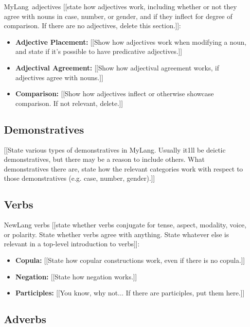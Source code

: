\documentclass[oneside]{book}
\newcommand{\LanguageName}{MyLang}
\begin{document}
\LanguageName\ adjectives [[state how adjectives work, including whether or not they agree with nouns in case, number, or gender, and if they inflect for degree of comparison.
If there are no adjectives, delete this section.]]:

\begin{itemize}
\item
\textbf{Adjective Placement:}
[[Show how adjectives work when modifying a noun, and state if it's possible to have predicative adjectives.]]
\item
\textbf{Adjectival Agreement:}
[[Show how adjectival agreement works, if adjectives agree with nouns.]]
\item
\textbf{Comparison:}
[[Show how adjectives inflect or otherwise showcase comparison.
If not relevant, delete.]]
\end{itemize}

\subsection{Demonstratives}

[[State various types of demonstratives in \LanguageName.
Usually it1ll be deictic demonstratives, but there may be a reason to include others.
What demonstratives there are, state how the relevant categories work with respect to those demonstratives (e.g. case, number, gender).]]

\subsection{Verbs}

NewLang verbs [[state whether verbs conjugate for tense, aspect, modality, voice, or polarity.
State whether verbs agree with anything.
State whatever else is relevant in a top-level introduction to verbs]]:

\begin{itemize}
\item
\textbf{Copula:}
[[State how copular constructions work, even if there is no copula.]]
\item
\textbf{Negation:}
[[State how negation works.]]
\item
\textbf{Participles:}
[[You know, why not$\ldots$
If there are participles, put them here.]]
\end{itemize}

\subsection{Adverbs}
\end{document}
